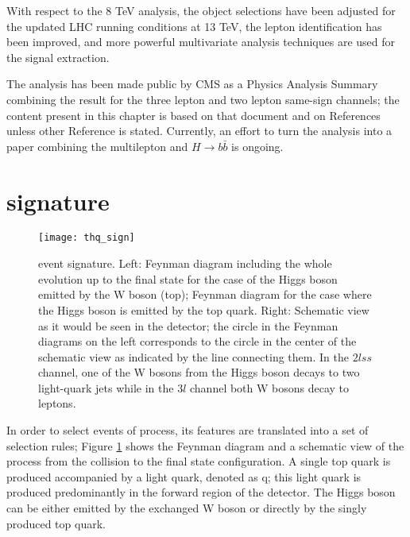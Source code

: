 With respect to the 8 TeV analysis, the object selections have been adjusted for the updated LHC running conditions at 13 TeV, the lepton identification has been improved, and more powerful multivariate analysis techniques are used for the signal extraction.

The analysis has been made public by CMS as a Physics Analysis Summary \cite{CMS_PAS_HIG_17-005} combining the result for the three lepton and two lepton same-sign channels; the content present in this chapter is based on that document and on References ~\cite{CMS_AN_2016-211, CMS_AN_2017-029} unless other Reference is stated. Currently, an effort to turn the analysis into a paper combining the multilepton and $H \to b\bar{b}$ is ongoing. 


\section{\tHq signature}\label{sec:thq_sign}

\begin{figure}[!h]
\begin{center}
\texttt{[image: thq\_sign]}
\end{center}
\caption[\tHq event signature]{\tHq event signature. Left: Feynman diagram including the whole evolution up to the final state for the case of the Higgs boson emitted by the W boson (top); Feynman diagram for the case where the Higgs boson is emitted by the top quark. Right: Schematic view as it would be seen in the detector; the circle in the Feynman diagrams on the left corresponds to the circle in the center of the schematic view as indicated by the line connecting them. In the $2lss$ channel, one of the W bosons from the Higgs boson decays to two light-quark jets while in the $3l$ channel both W bosons decay to leptons.}
\label{fig:thq_sign}
\end{figure}

In order to select events of \tHq process, its features are translated into a set of selection rules; Figure \ref{fig:thq_sign} shows the Feynman diagram and a schematic view of the \tHq process from the \pp collision to the final state configuration. A single top quark is produced accompanied by a light quark, denoted as q; this light quark is produced predominantly in the forward region of the detector. The Higgs boson can be either emitted by the exchanged W boson or directly by the singly produced top quark.

